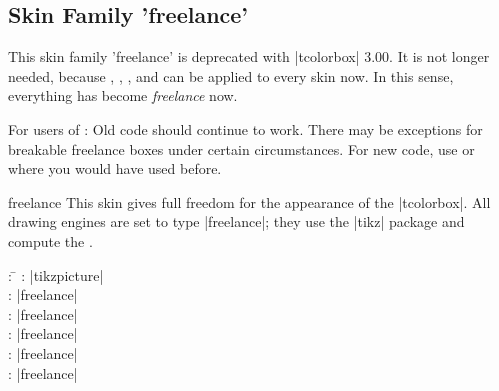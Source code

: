\begin{dispExample}
\vspace*{3mm}
\begin{tcolorbox}[draft,title=A colored box with the 'draft' skin]
\lipsum[1-3]
\tcblower
\lipsum[4-6]
\end{tcolorbox}
\end{dispExample}



\clearpage
\subsection{Skin Family 'freelance'}
\begin{marker}
This skin family 'freelance' is deprecated with |tcolorbox| 3.00.
It is not longer needed, because
,
,
, and
can be applied to every skin now. In this sense, everything has become
\emph{freelance} now.\par
For users of : Old code should continue to work. There may be
exceptions for breakable freelance boxes under certain circumstances.
For new code, use  or  where
you would have used  before.
\end{marker}

\begin{docSkin}{freelance}
  This skin gives full freedom for the appearance of the |tcolorbox|.
  All drawing engines are set to type |freelance|; they use the |tikz| package
  and compute the .
\begin{tcolorbox}[skintable=freelance]
  \begin{tabbing}
    : \=\kill
    :  \> |tikzpicture|\\ 
    :           \> |freelance|\\
    : \> |freelance|\\ 
    :        \> |freelance|\\
    :    \> |freelance|\\
    :           \> |freelance|
  \end{tabbing}
\end{tcolorbox}
\end{docSkin}

